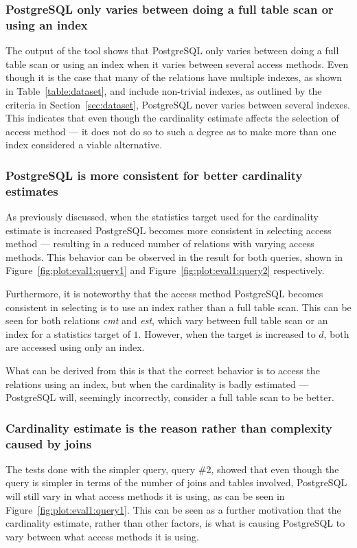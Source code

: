 \subsubsection{PostgreSQL only varies between doing a full table scan or using an index}
The output of the tool shows that PostgreSQL only varies between doing a full
table scan or using an index when it varies between several access methods. Even
though it is the case that many of the relations have multiple indexes, as shown
in Table~\ref{table:dataset}, and include non-trivial indexes, as outlined by
the criteria in Section~\ref{sec:dataset}, PostgreSQL never varies between
several indexes. This indicates that even though the cardinality estimate
affects the selection of access method --- it does not do so to such a degree as
to make more than one index considered a viable alternative.

\subsubsection{PostgreSQL is more consistent for better cardinality estimates}
As previously discussed, when the statistics target used for the cardinality
estimate is increased PostgreSQL becomes more consistent in selecting access
method --- resulting in a reduced number of relations with varying access
methods. This behavior can be observed in the result for both queries, shown in
Figure~\ref{fig:plot:eval1:query1} and Figure~\ref{fig:plot:eval1:query2}
respectively.

Furthermore, it is noteworthy that the access method PostgreSQL becomes
consistent in selecting is to use an index rather than a full table scan. This
can be seen for both relations \textit{cmt} and \textit{est}, which vary between
full table scan or an index for a statistics target of $1$. However, when the
target is increased to $d$, both are accessed using only an index.

What can be derived from this is that the correct behavior is to access the
relations using an index, but when the cardinality is badly estimated ---
PostgreSQL will, seemingly incorrectly, consider a full table scan to be better.

\subsubsection{Cardinality estimate is the reason rather than complexity caused
  by joins}
The tests done with the simpler query, query \#2, showed that even though the
query is simpler in terms of the number of joins and tables involved, PostgreSQL
will still vary in what access methods it is using, as can be seen in
Figure~\ref{fig:plot:eval1:query1}. This can be seen as a further motivation that
the cardinality estimate, rather than other factors, is what is causing
PostgreSQL to vary between what access methods it is using.

